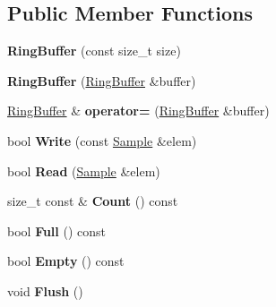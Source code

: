 \subsection*{Public Member Functions}
\begin{DoxyCompactItemize}
\item 
\hypertarget{class_ring_buffer_a528b342b802f6841b66e6c8760335414}{{\bfseries Ring\+Buffer} (const size\+\_\+t size)}\label{class_ring_buffer_a528b342b802f6841b66e6c8760335414}

\item 
\hypertarget{class_ring_buffer_a8a2eeb957af8cb1cde9c711ed9149542}{{\bfseries Ring\+Buffer} (\hyperlink{class_ring_buffer}{Ring\+Buffer} \&buffer)}\label{class_ring_buffer_a8a2eeb957af8cb1cde9c711ed9149542}

\item 
\hypertarget{class_ring_buffer_a7ccdd87d908ba42ebab9d07ac2c4a62c}{\hyperlink{class_ring_buffer}{Ring\+Buffer} \& {\bfseries operator=} (\hyperlink{class_ring_buffer}{Ring\+Buffer} \&buffer)}\label{class_ring_buffer_a7ccdd87d908ba42ebab9d07ac2c4a62c}

\item 
\hypertarget{class_ring_buffer_a3e1f9185cf9cf52f381e1029278ddf6d}{bool {\bfseries Write} (const \hyperlink{class_sample}{Sample} \&elem)}\label{class_ring_buffer_a3e1f9185cf9cf52f381e1029278ddf6d}

\item 
\hypertarget{class_ring_buffer_adab76bf1e1797713ade17ad9c89cf4d3}{bool {\bfseries Read} (\hyperlink{class_sample}{Sample} \&elem)}\label{class_ring_buffer_adab76bf1e1797713ade17ad9c89cf4d3}

\item 
\hypertarget{class_ring_buffer_a1f3ac2b839b2a0834e6ca9071d9d4a37}{size\+\_\+t const \& {\bfseries Count} () const }\label{class_ring_buffer_a1f3ac2b839b2a0834e6ca9071d9d4a37}

\item 
\hypertarget{class_ring_buffer_a0b911fba6a54a4a76cd9de8e9b954971}{bool {\bfseries Full} () const }\label{class_ring_buffer_a0b911fba6a54a4a76cd9de8e9b954971}

\item 
\hypertarget{class_ring_buffer_a748d33eb5ca08cdb63c967be6bd33a8e}{bool {\bfseries Empty} () const }\label{class_ring_buffer_a748d33eb5ca08cdb63c967be6bd33a8e}

\item 
\hypertarget{class_ring_buffer_a66d87ffb1eb3ea864cb2ecc6dd09e507}{void {\bfseries Flush} ()}\label{class_ring_buffer_a66d87ffb1eb3ea864cb2ecc6dd09e507}

\end{DoxyCompactItemize}
